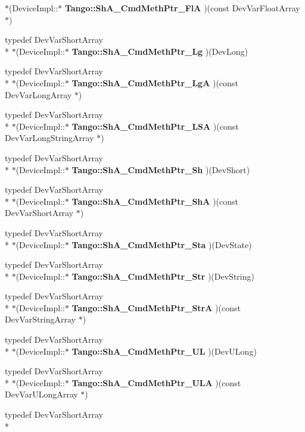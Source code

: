 \begin{DoxyCompactItemize}
$\ast$(Device\-Impl\-::$\ast$ {\bf Tango\-::\-Sh\-A\-\_\-\-Cmd\-Meth\-Ptr\-\_\-\-Fl\-A} )(const Dev\-Var\-Float\-Array $\ast$)
\item 
typedef Dev\-Var\-Short\-Array \\*
$\ast$(Device\-Impl\-::$\ast$ {\bf Tango\-::\-Sh\-A\-\_\-\-Cmd\-Meth\-Ptr\-\_\-\-Lg} )(Dev\-Long)
\item 
typedef Dev\-Var\-Short\-Array \\*
$\ast$(Device\-Impl\-::$\ast$ {\bf Tango\-::\-Sh\-A\-\_\-\-Cmd\-Meth\-Ptr\-\_\-\-Lg\-A} )(const Dev\-Var\-Long\-Array $\ast$)
\item 
typedef Dev\-Var\-Short\-Array \\*
$\ast$(Device\-Impl\-::$\ast$ {\bf Tango\-::\-Sh\-A\-\_\-\-Cmd\-Meth\-Ptr\-\_\-\-L\-S\-A} )(const Dev\-Var\-Long\-String\-Array $\ast$)
\item 
typedef Dev\-Var\-Short\-Array \\*
$\ast$(Device\-Impl\-::$\ast$ {\bf Tango\-::\-Sh\-A\-\_\-\-Cmd\-Meth\-Ptr\-\_\-\-Sh} )(Dev\-Short)
\item 
typedef Dev\-Var\-Short\-Array \\*
$\ast$(Device\-Impl\-::$\ast$ {\bf Tango\-::\-Sh\-A\-\_\-\-Cmd\-Meth\-Ptr\-\_\-\-Sh\-A} )(const Dev\-Var\-Short\-Array $\ast$)
\item 
typedef Dev\-Var\-Short\-Array \\*
$\ast$(Device\-Impl\-::$\ast$ {\bf Tango\-::\-Sh\-A\-\_\-\-Cmd\-Meth\-Ptr\-\_\-\-Sta} )(Dev\-State)
\item 
typedef Dev\-Var\-Short\-Array \\*
$\ast$(Device\-Impl\-::$\ast$ {\bf Tango\-::\-Sh\-A\-\_\-\-Cmd\-Meth\-Ptr\-\_\-\-Str} )(Dev\-String)
\item 
typedef Dev\-Var\-Short\-Array \\*
$\ast$(Device\-Impl\-::$\ast$ {\bf Tango\-::\-Sh\-A\-\_\-\-Cmd\-Meth\-Ptr\-\_\-\-Str\-A} )(const Dev\-Var\-String\-Array $\ast$)
\item 
typedef Dev\-Var\-Short\-Array \\*
$\ast$(Device\-Impl\-::$\ast$ {\bf Tango\-::\-Sh\-A\-\_\-\-Cmd\-Meth\-Ptr\-\_\-\-U\-L} )(Dev\-U\-Long)
\item 
typedef Dev\-Var\-Short\-Array \\*
$\ast$(Device\-Impl\-::$\ast$ {\bf Tango\-::\-Sh\-A\-\_\-\-Cmd\-Meth\-Ptr\-\_\-\-U\-L\-A} )(const Dev\-Var\-U\-Long\-Array $\ast$)
\item 
typedef Dev\-Var\-Short\-Array \\*

\end{DoxyCompactItemize}
